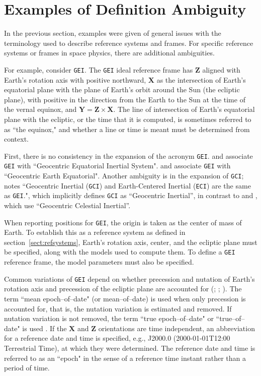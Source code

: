 \documentclass[draft]{agujournal2019}
\begin{document}
\section{Examples of Definition Ambiguity}
\label{sect:definitions}

In the previous section, examples were given of general issues with the terminology used to describe reference systems and frames. For specific reference systems or frames in space physics, there are additional ambiguities.

For example, consider \texttt{GEI}. The \texttt{GEI} ideal reference frame has $\mathbf{Z}$ aligned with Earth's rotation axis with positive northward, $\mathbf{X}$ as the intersection of Earth's equatorial plane with the plane of Earth's orbit around the Sun (the ecliptic plane), with positive in the direction from the Earth to the Sun at the time of the vernal equinox, and $\mathbf{Y}=\mathbf{Z}\times\mathbf{X}$. The line of intersection of Earth's equatorial plane with the ecliptic, or the time that it is computed, is sometimes referred to as ``the equinox," and whether a line or time is meant must be determined from context.

First, there is no consistency in the expansion of the acronym \texttt{GEI}.  and  associate \texttt{GEI} with ``Geocentric Equatorial Inertial System".  and  associate \texttt{GEI} with ``Geocentric Earth Equatorial". Another ambiguity is in the expansion of \texttt{GCI};  notes ``Geocentric Inertial (\texttt{GCI}) and Earth-Centered Inertial (\texttt{ECI}) are the same as \texttt{GEI}.", which implicitly defines \texttt{GCI} as ``Geocentric Inertial'', in contrast to  and
, which use ``Geocentric Celestial Inertial''. 


When reporting positions for \texttt{GEI}, the origin is taken as the center of mass of Earth. To establish this as a reference system as defined in section~\ref{sect:refsystems}, Earth's rotation axis, center, and the ecliptic plane must be specified, along with the models used to compute them. To define a \texttt{GEI} reference frame, the model parameters must also be specified.

Common variations of \texttt{GEI} depend on whether precession and nutation of Earth's rotation axis and precession of the ecliptic plane are accounted for (; ; ). The term ``mean epoch--of--date" (or mean--of--date) is used when only precession is accounted for, that is, the nutation variation is estimated and removed. If nutation variation is not removed, the term ``true epoch--of--date" or ``true--of--date" is used \cite{Hapgood1995}. If the $\mathbf{X}$ and $\mathbf{Z}$ orientations are time independent, an abbreviation for a reference date and time is specified, e.g., J2000.0 (2000-01-01T12:00 Terrestrial Time), at which they were determined. The reference date and time is referred to as an ``epoch" in the sense of a reference time instant rather than a period of time.
\end{document}
